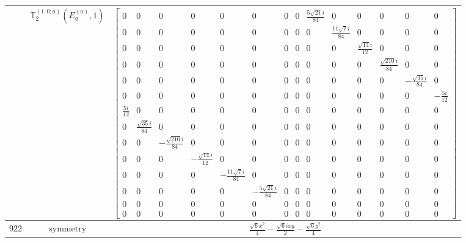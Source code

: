 \documentclass[fleqn,8pt,landscape]{jsarticle}
\begin{document}
\begin{longtable}{ccc}
$  $ & $ \mathbb{T}_{2}^{(1,0;a)}(E_{g}^{(a)},1) $ & $ \begin{bmatrix} 0 & 0 & 0 & 0 & 0 & 0 & 0 & 0 & \frac{5 \sqrt{21} i}{84} & 0 & 0 & 0 & 0 & 0 \\ 0 & 0 & 0 & 0 & 0 & 0 & 0 & 0 & 0 & \frac{11 \sqrt{7} i}{84} & 0 & 0 & 0 & 0 \\ 0 & 0 & 0 & 0 & 0 & 0 & 0 & 0 & 0 & 0 & \frac{\sqrt{14} i}{12} & 0 & 0 & 0 \\ 0 & 0 & 0 & 0 & 0 & 0 & 0 & 0 & 0 & 0 & 0 & \frac{\sqrt{210} i}{84} & 0 & 0 \\ 0 & 0 & 0 & 0 & 0 & 0 & 0 & 0 & 0 & 0 & 0 & 0 & - \frac{\sqrt{35} i}{84} & 0 \\ 0 & 0 & 0 & 0 & 0 & 0 & 0 & 0 & 0 & 0 & 0 & 0 & 0 & - \frac{5 i}{12} \\ \frac{5 i}{12} & 0 & 0 & 0 & 0 & 0 & 0 & 0 & 0 & 0 & 0 & 0 & 0 & 0 \\ 0 & \frac{\sqrt{35} i}{84} & 0 & 0 & 0 & 0 & 0 & 0 & 0 & 0 & 0 & 0 & 0 & 0 \\ 0 & 0 & - \frac{\sqrt{210} i}{84} & 0 & 0 & 0 & 0 & 0 & 0 & 0 & 0 & 0 & 0 & 0 \\ 0 & 0 & 0 & - \frac{\sqrt{14} i}{12} & 0 & 0 & 0 & 0 & 0 & 0 & 0 & 0 & 0 & 0 \\ 0 & 0 & 0 & 0 & - \frac{11 \sqrt{7} i}{84} & 0 & 0 & 0 & 0 & 0 & 0 & 0 & 0 & 0 \\ 0 & 0 & 0 & 0 & 0 & - \frac{5 \sqrt{21} i}{84} & 0 & 0 & 0 & 0 & 0 & 0 & 0 & 0 \\ 0 & 0 & 0 & 0 & 0 & 0 & 0 & 0 & 0 & 0 & 0 & 0 & 0 & 0 \\ 0 & 0 & 0 & 0 & 0 & 0 & 0 & 0 & 0 & 0 & 0 & 0 & 0 & 0 \end{bmatrix} $ \\ \hline
$ 922 $ & $ \text{symmetry} $ & $ \frac{\sqrt{6} x^{2}}{4} - \frac{\sqrt{6} i x y}{2} - \frac{\sqrt{6} y^{2}}{4} $ \\

\end{longtable}
\end{document}
